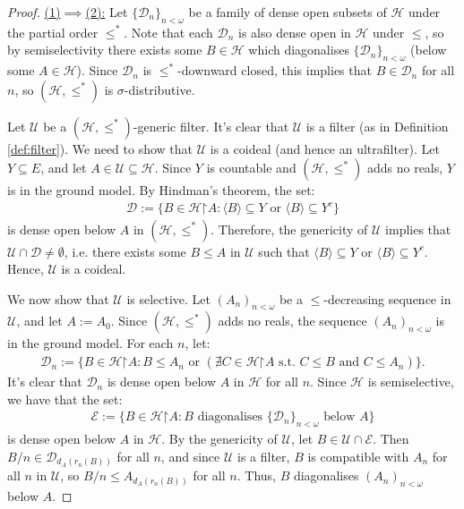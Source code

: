 \documentclass[10pt,a4paper]{amsart}
\theoremstyle{plain}
\numberwithin{equation}{section}
\theoremstyle{definition}
\renewcommand{\c}[1]{\langle #1 \rangle}
\newcommand{\cal}{\mathcal}
\newcommand{\restrictedto}{\mathord{\upharpoonright}}
\newcommand{\U}{\cal{U}}
\renewcommand{\H}{\cal{H}}
\newcommand{\D}{\cal{D}}
\newcommand{\E}{\cal{E}}
\begin{document}
\begin{proof}
    \underline{(1)$\implies$(2):} Let $\{\D_n\}_{n<\omega}$ be a family of dense open subsets of $\H$ under the partial order $\leq^*$. Note that each $\D_n$ is also dense open in $\H$ under $\leq$, so by semiselectivity there exists some $B \in \H$ which diagonalises $\{\D_n\}_{n<\omega}$ (below some $A \in \H$). Since $\D_n$ is $\leq^*$-downward closed, this implies that $B \in \D_n$ for all $n$, so $(\H,\leq^*)$ is $\sigma$-distributive.

    Let $\U$ be a $(\H,\leq^*)$-generic filter. It's clear that $\U$ is a filter (as in Definition \ref{def:filter}). We need to show that $\U$ is a coideal (and hence an ultrafilter). Let $Y \subseteq E$, and let $A \in \U \subseteq \H$. Since $Y$ is countable and $(\H,\leq^*)$ adds no reals, $Y$ is in the ground model. By Hindman's theorem, the set:
    \begin{align*}
        \D := \{B \in \H\restrictedto A : \c{B} \subseteq Y \text{ or } \c{B} \subseteq Y^c\}
    \end{align*}
    is dense open below $A$ in $(\H,\leq^*)$. Therefore, the genericity of $\U$ implies that $\U \cap \D \neq \emptyset$, i.e. there exists some $B \leq A$ in $\U$ such that $\c{B} \subseteq Y$ or $\c{B} \subseteq Y^c$. Hence, $\U$ is a coideal.

    We now show that $\U$ is selective. Let $(A_n)_{n<\omega}$ be a $\leq$-decreasing sequence in $\U$, and let $A := A_0$. Since $(\H,\leq^*)$ adds no reals, the sequence $(A_n)_{n<\omega}$ is in the ground model. For each $n$, let:
    \begin{align*}
        \D_n := \{B \in \H\restrictedto A : B \leq A_n \text{ or } (\nexists C \in \H\restrictedto A \text{ s.t. } C \leq B \text{ and } C \leq A_n)\}.
    \end{align*}
    It's clear that $\D_n$ is dense open below $A$ in $\H$ for all $n$. Since $\H$ is semiselective, we have that the set:
    \begin{align*}
        \E := \{B \in \H\restrictedto A : \text{$B$ diagonalises $\{\D_n\}_{n<\omega}$ below $A$}\}
    \end{align*}
    is dense open below $A$ in $\H$. By the genericity of $\U$, let $B \in \U \cap \E$. Then $B/n \in \D_{d_A(r_n(B))}$ for all $n$, and since $\U$ is a filter, $B$ is compatible with $A_n$ for all $n$ in $\U$, so $B/n \leq A_{d_A(r_n(B))}$ for all $n$. Thus, $B$ diagonalises $(A_n)_{n<\omega}$ below $A$.


\end{proof}
\end{document}
